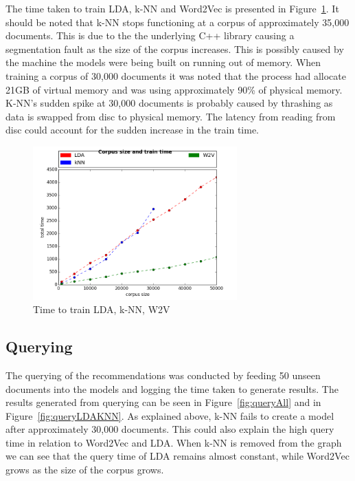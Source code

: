 The time taken to train LDA, k-NN and Word2Vec is presented in Figure~\ref{fig:TrainAll}.
It should be noted that k-NN stops functioning at a corpus of approximately 35,000 documents.
This is due to the the underlying C++ library causing a segmentation fault as the size of the corpus increases.
This is possibly caused by the machine the models were being built on running out of memory.
When training a corpus of 30,000 documents it was noted that the process had allocate 21GB of virtual memory and was using approximately 90\% of physical memory.
K-NN's sudden spike at 30,000 documents is probably caused by thrashing as data is swapped from disc to physical memory.
The latency from reading from disc could account for the sudden increase in the train time.

\begin{figure}[h]
    \centering
        \includegraphics[width=0.7\textwidth]{Figures/TrainAll.png}
    \caption{Time to train LDA, k-NN, W2V}
    \label{fig:TrainAll}
\end{figure}

\subsection{Querying}
The querying of the recommendations was conducted by feeding 50 unseen documents into the models and logging the time taken to generate results.
The results generated from querying can be seen in Figure~\ref{fig:queryAll} and in Figure~\ref{fig:queryLDAKNN}.
As explained above, k-NN fails to create a model after approximately 30,000 documents.
This could also explain the high query time in relation to Word2Vec and LDA.
When k-NN is removed from the graph we can see that the query time of LDA remains almost constant, while Word2Vec grows as the size of the corpus grows.

